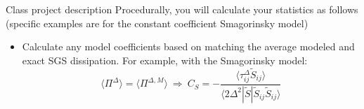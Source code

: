 \begin{frame}{Class project description}
Procedurally, you will calculate your statistics as follows (specific examples are for the constant coefficient Smagorinsky model)
\begin{itemize}
	\item Calculate any model coefficients based on matching the average modeled and exact SGS dissipation. For example, with the Smagorinsky model:
\begin{equation}
\langle \Pi^{\Delta} \rangle=\langle \Pi^{\Delta,M} \rangle \ \Rightarrow \ 
C_S = -\frac{\langle \tau_{ij}^{\Delta}\tilde{S}_{ij} \rangle}
{\langle 2\Delta^2|\tilde{S}|\tilde{S}_{ij}\tilde{S}_{ij}\rangle} \nonumber
\end{equation}
	\end{itemize}
\end{frame}




